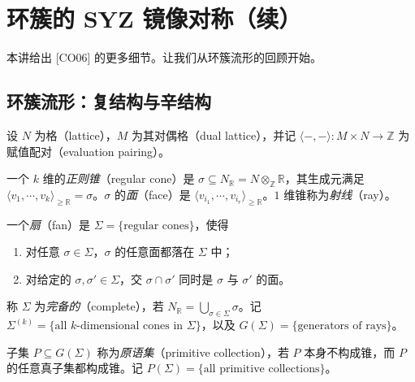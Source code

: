 
\section{环簇的 SYZ 镜像对称（续）}

本讲给出 [CO06] 的更多细节。让我们从环簇流形的回顾开始。


\subsection{环簇流形：复结构与辛结构}

设 $N$ 为格（lattice），$M$ 为其对偶格（dual lattice），并记 $\langle -,-\rangle\colon M\times N\to\mathbb{Z}$ 为赋值配对（evaluation pairing）。

\begin{definition*}
一个 $k$ 维的\emph{正则锥}（regular cone）是 $\sigma\subseteq N_{\mathbb{R}}=N\otimes_{\mathbb{Z}}\mathbb{R}$，其生成元满足 $\langle v_1,\dotsb, v_k\rangle_{\geq\mathbb{R}}=\sigma$。$\sigma$ 的\emph{面}（face）是 $\langle v_{i_1},\dotsb, v_{i_r}\rangle_{\geq\mathbb{R}}$。$1$ 维锥称为\emph{射线}（ray）。
\end{definition*}

\begin{definition*}
一个\emph{扇}（fan）是 $\Sigma=\{\text{regular cones}\}$，使得
\begin{enumerate}[label=\arabic*),leftmargin=1.9em,itemsep=1pt,topsep=2pt]
  \item 对任意 $\sigma\in\Sigma$，$\sigma$ 的任意面都落在 $\Sigma$ 中；
  \item 对给定的 $\sigma,\sigma'\in\Sigma$，交 $\sigma\cap\sigma'$ 同时是 $\sigma$ 与 $\sigma'$ 的面。
\end{enumerate}
\end{definition*}

称 $\Sigma$ 为\emph{完备的}（complete），若 $N_{\mathbb{R}}=\displaystyle\bigcup_{\sigma\in\Sigma}\sigma$。记 $\Sigma^{(k)}=\{\text{all }k\text{-dimensional cones in }\Sigma\}$，以及 $G(\Sigma)=\{\text{generators of rays}\}$。

\begin{definition*}
子集 $P\subseteq G(\Sigma)$ 称为\emph{原语集}（primitive collection），若 $P$ 本身不构成锥，而 $P$ 的任意真子集都构成锥。记 $P(\Sigma)=\{\text{all primitive collections}\}$。
\end{definition*}

